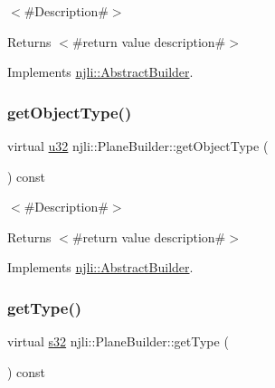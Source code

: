 $<$\#\+Description\#$>$

\begin{DoxyReturn}{Returns}
$<$\#return value description\#$>$ 
\end{DoxyReturn}


Implements \mbox{\hyperlink{classnjli_1_1_abstract_builder_a902f73ea78031b06aca183a417f3413b}{njli\+::\+Abstract\+Builder}}.

\mbox{\label{classnjli_1_1_plane_builder_a7abe7585ac11bd21f6c6bb801a004ab0}} 
\subsubsection{\texorpdfstring{get\+Object\+Type()}{getObjectType()}}
{\footnotesize\ttfamily virtual \mbox{\hyperlink{_util_8h_a10e94b422ef0c20dcdec20d31a1f5049}{u32}} njli\+::\+Plane\+Builder\+::get\+Object\+Type (\begin{DoxyParamCaption}{ }\end{DoxyParamCaption}) const\hspace{0.3cm}{\ttfamily [virtual]}}

$<$\#\+Description\#$>$

\begin{DoxyReturn}{Returns}
$<$\#return value description\#$>$ 
\end{DoxyReturn}


Implements \mbox{\hyperlink{classnjli_1_1_abstract_builder_a0f2d344fcf697b167f4f2b1122b5fb33}{njli\+::\+Abstract\+Builder}}.

\mbox{\label{classnjli_1_1_plane_builder_a0fc49801f10941b2e3084d0a05d70f4c}} 
\subsubsection{\texorpdfstring{get\+Type()}{getType()}}
{\footnotesize\ttfamily virtual \mbox{\hyperlink{_util_8h_aa62c75d314a0d1f37f79c4b73b2292e2}{s32}} njli\+::\+Plane\+Builder\+::get\+Type (\begin{DoxyParamCaption}{ }\end{DoxyParamCaption}) const\hspace{0.3cm}{\ttfamily [virtual]}}

